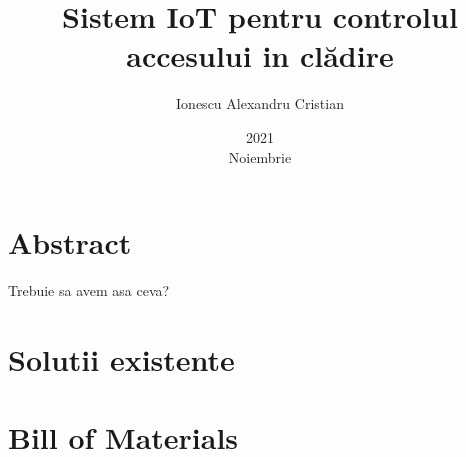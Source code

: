 \documentclass[12pt,english]{report}
\title{Sistem IoT pentru controlul\\accesului in clădire}
\date{2021\\ Noiembrie}
\author{Ionescu Alexandru Cristian}
\begin{document}
\maketitle

\chapter*{Abstract}
Trebuie sa avem asa ceva?

\tableofcontents

\chapter{Solutii existente}



\chapter{Bill of Materials}



\printbibliography
\end{document}
